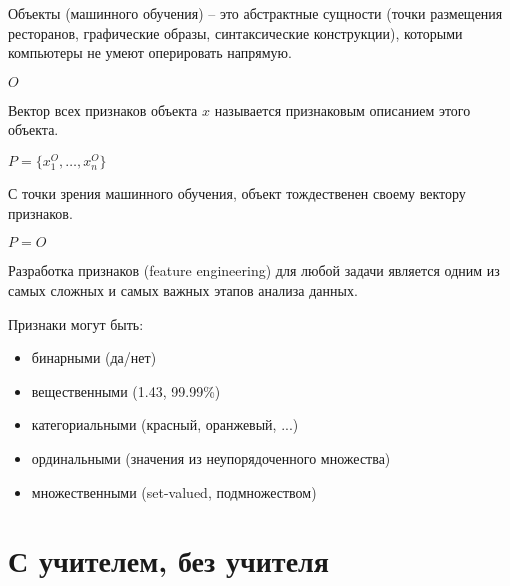 \documentclass[pdf, intlimits, 9pt, unicode]{beamer}
\begin{document}
\begin{frame}

{\color{red}Объекты} (машинного обучения) -- это абстрактные сущности (точки размещения ресторанов, графические образы, синтаксические конструкции), которыми компьютеры не умеют оперировать напрямую.

\begin{center}$O$
\end{center}\medskip\pause

Вектор всех признаков объекта $x$ называется признаковым описанием этого объекта.

\begin{center}$P = \lbrace x_1^O, \dots, x_n^O \rbrace$
\end{center}\medskip\pause

С точки зрения машинного обучения, объект тождественен своему вектору признаков.

\begin{center}
$P = O$
\end{center}

\end{frame}





\begin{frame}

Разработка признаков ({\color{red}feature engineering}) для любой задачи является одним из самых сложных и самых важных этапов анализа данных.\pause

Признаки могут быть:

\begin{itemize}
	\item бинарными (да/нет)\pause
	\item вещественными (1.43, 99.99\%)\pause
	\item категориальными (красный, оранжевый, ...)\pause
	\item ординальными (значения из неупорядоченного множества)\pause
	\item множественными (set-valued, подмножеством)
\end{itemize}

\end{frame}







\section{С учителем, без учителя}
\end{document}
